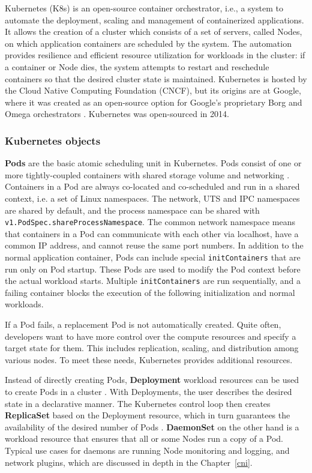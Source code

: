 \documentclass[english, 12pt, a4paper, sci, utf8, a-2b, online]{aaltothesis}
\begin{document}
Kubernetes (K8s) \cite{kubernetes} is an open-source container orchestrator, i.e., a system to automate the deployment, scaling and management of containerized applications.
It allows the creation of a cluster which consists of a set of servers, called Nodes, on which application containers are scheduled by the system.
The automation provides resilience and efficient resource utilization for workloads in the cluster: if a container or Node dies, the system attempts to restart and reschedule containers so that the desired cluster state is maintained.
Kubernetes is hosted by the Cloud Native Computing Foundation (CNCF), but its origins are at Google, where it was created as an open-source option for Google's proprietary Borg and Omega orchestrators \cite{burns2016borg}.
Kubernetes was open-sourced in 2014.

\subsubsection{Kubernetes objects}

\textbf{Pods} are the basic atomic scheduling unit in Kubernetes.
Pods consist of one or more tightly-coupled containers with shared storage volume and networking \cite{k8s-docs-pods}.
Containers in a Pod are always co-located and co-scheduled and run in a shared context, i.e. a set of Linux namespaces.
The network, UTS and IPC namespaces are shared by default, and the process namespace can be shared with \texttt{v1.PodSpec.shareProcessNamespace}.
The common network namespace means that containers in a Pod can communicate with each other via localhost, have a common IP address, and cannot reuse the same port numbers.
In addition to the normal application container, Pods can include special \texttt{initContainers} that are run only on Pod startup.
These Pods are used to modify the Pod context before the actual workload starts.
Multiple \texttt{initContainers} are run sequentially, and a failing container blocks the execution of the following initialization and normal workloads.

If a Pod fails, a replacement Pod is not automatically created.
Quite often, developers want to have more control over the compute resources and specify a target state for them.
This includes replication, scaling, and distribution among various nodes.
To meet these needs, Kubernetes provides additional resources.

Instead of directly creating Pods, \textbf{Deployment} workload resources can be used to create Pods in a cluster \cite{k8s-docs-pods}.
With Deployments, the user describes the desired state in a declarative manner.
The Kubernetes control loop then creates \textbf{ReplicaSet} based on the Deployment resource, which in turn guarantees the availability of the desired number of Pods \cite{k8s-docs-deployment}.
\textbf{DaemonSet} on the other hand is a workload resource that ensures that all or some Nodes run a copy of a Pod.
Typical use cases for daemons are running Node monitoring and logging, and network plugins, which are discussed in depth in the Chapter~\ref{cni}.
\end{document}
